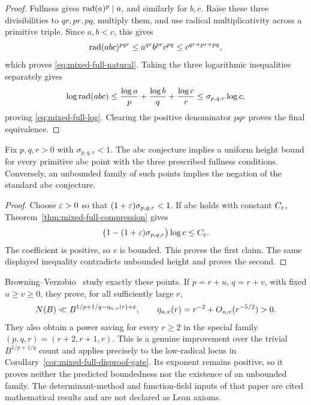 \begin{proof}
Fullness gives $\operatorname{rad}(a)^p\mid a$, and similarly for $b,c$.
Raise these three divisibilities to $qr,pr,pq$, multiply them, and use
radical multiplicativity across a primitive triple.  Since $a,b<c$, this
gives
\[
 \operatorname{rad}(abc)^{pqr}
 \le a^{qr}b^{pr}c^{pq}
 \le c^{qr+pr+pq},
\]
which proves \eqref{eq:mixed-full-natural}.  Taking the three logarithmic
inequalities separately gives
\[
 \log\operatorname{rad}(abc)
 \le \frac{\log a}{p}+\frac{\log b}{q}+\frac{\log c}{r}
 \le \sigma_{p,q,r}\log c,
\]
proving \eqref{eq:mixed-full-log}.  Clearing the positive denominator $pqr$
proves the final equivalence.
\end{proof}

\begin{corollary}
\label{cor:mixed-full-disproof-gate}
Fix $p,q,r>0$ with $\sigma_{p,q,r}<1$.  The abc conjecture implies a
uniform height bound for every primitive abc point with the three prescribed
fullness conditions.  Conversely, an unbounded family of such points
implies the negation of the standard abc conjecture.
\end{corollary}

\begin{proof}
Choose $\varepsilon>0$ so that $(1+\varepsilon)\sigma_{p,q,r}<1$.  If abc holds with
constant $C_\varepsilon$, Theorem~\ref{thm:mixed-full-compression} gives
\[
 \bigl(1-(1+\varepsilon)\sigma_{p,q,r}\bigr)\log c\le C_\varepsilon.
\]
The coefficient is positive, so $c$ is bounded.  This proves the first
claim.  The same displayed inequality contradicts unbounded height and
proves the second.
\end{proof}

Browning--Verzobio~\cite[Theorems 1.1 and 1.2]{BrowningVerzobio2026}
study exactly these points.  If $p=r+u$, $q=r+v$, with fixed $u\geq v\geq0$,
they prove, for all sufficiently large $r$,
\[
 N(B)\ll B^{1/p+1/q-\eta_{u,v}(r)+\varepsilon},\qquad
 \eta_{u,v}(r)=r^{-2}+O_{u,v}(r^{-5/2})>0.
\]
They also obtain a power saving for every $r\geq2$ in the special family
$(p,q,r)=(r+2,r+1,r)$.  This is a genuine improvement over the trivial
$B^{1/p+1/q}$ count and applies precisely to the low-radical locus in
Corollary~\ref{cor:mixed-full-disproof-gate}.  Its exponent remains positive,
so it proves neither the predicted boundedness nor the existence of an
unbounded family.  The determinant-method and function-field inputs of that
paper are cited mathematical results and are not declared as Lean axioms.

